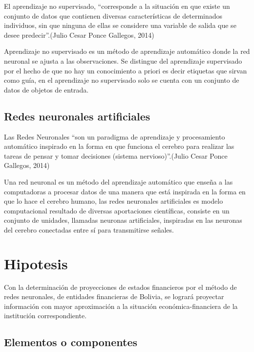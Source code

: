 \documentclass[
  12pt,
]{article}
\begin{document}
El aprendizaje no supervisado, ``corresponde a la situación en que
existe un conjunto de datos que contienen diversas características de
determinados individuos, sin que ninguna de ellas se considere una
variable de salida que se desee predecir''.(Julio Cesar Ponce Gallegos,
2014)

Aprendizaje no supervisado es un método de aprendizaje automático donde
la red neuronal se ajusta a las observaciones. Se distingue del
aprendizaje supervisado por el hecho de que no hay un conocimiento a
priori es decir etiquetas que sirvan como guía, en el aprendizaje no
supervisado solo se cuenta con un conjunto de datos de objetos de
entrada.

\hypertarget{redes-neuronales-artificiales}{%
\subsection{Redes neuronales
artificiales}\label{redes-neuronales-artificiales}}

Las Redes Neuronales ``son un paradigma de aprendizaje y procesamiento
automático inspirado en la forma en que funciona el cerebro para
realizar las tareas de pensar y tomar decisiones (sistema
nervioso)''.(Julio Cesar Ponce Gallegos, 2014)

Una red neuronal es un método del aprendizaje automático que enseña a
las computadoras a procesar datos de una manera que está inspirada en la
forma en que lo hace el cerebro humano, las redes neuronales
artificiales es modelo computacional resultado de diversas aportaciones
científicas, consiste en un conjunto de unidades, llamadas neuronas
artificiales, inspiradas en las neuronas del cerebro conectadas entre sí
para transmitirse señales.

\hypertarget{hipotesis}{%
\section{Hipotesis}\label{hipotesis}}

Con la determinación de proyecciones de estados financieros por el
método de redes neuronales, de entidades financieras de Bolivia, se
logrará proyectar información con mayor aproximación a la situación
económica-financiera de la institución correspondiente.

\hypertarget{elementos-o-componentes}{%
\subsection{Elementos o componentes}\label{elementos-o-componentes}}
\end{document}
